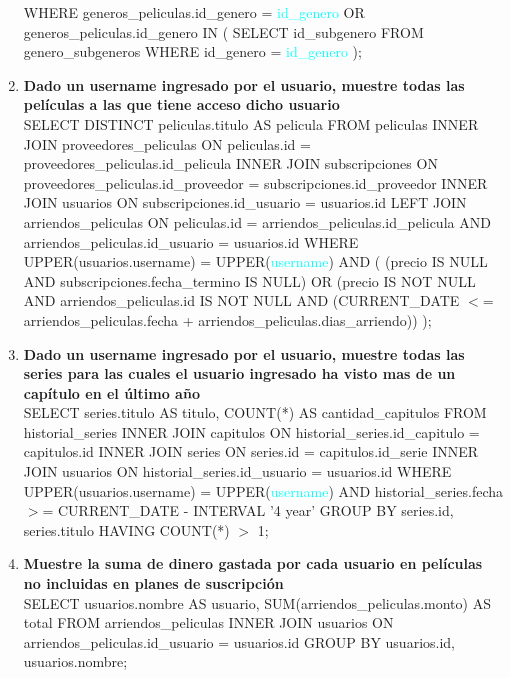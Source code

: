 \documentclass{article}
\begin{document}
\begin{enumerate}
    WHERE generos\_peliculas.id\_genero = \textcolor{cyan}{id\_genero}
    OR generos\_peliculas.id\_genero IN (
        SELECT id\_subgenero FROM genero\_subgeneros WHERE id\_genero = \textcolor{cyan}{id\_genero}
    );
\newpage
    \item \textbf{Dado un username ingresado por el usuario, muestre todas las películas a las que tiene acceso dicho usuario} \\
    SELECT DISTINCT peliculas.titulo AS pelicula FROM peliculas
    INNER JOIN proveedores\_peliculas ON peliculas.id = proveedores\_peliculas.id\_pelicula
    INNER JOIN subscripciones ON proveedores\_peliculas.id\_proveedor = subscripciones.id\_proveedor
    INNER JOIN usuarios ON subscripciones.id\_usuario = usuarios.id
    LEFT JOIN arriendos\_peliculas ON peliculas.id = arriendos\_peliculas.id\_pelicula AND arriendos\_peliculas.id\_usuario = usuarios.id
    WHERE UPPER(usuarios.username) = UPPER(\textcolor{cyan}{username})
    AND (
        (precio IS NULL AND subscripciones.fecha\_termino IS NULL)
        OR
        (precio IS NOT NULL AND arriendos\_peliculas.id IS NOT NULL AND (CURRENT\_DATE $<$= arriendos\_peliculas.fecha + arriendos\_peliculas.dias\_arriendo))
    );
    \item \textbf{Dado un username ingresado por el usuario, muestre todas las series para las cuales el usuario ingresado ha visto mas de un capítulo en el último año} \\
    SELECT series.titulo AS titulo, COUNT(*) AS cantidad\_capitulos FROM historial\_series
    INNER JOIN capitulos ON historial\_series.id\_capitulo = capitulos.id
    INNER JOIN series ON series.id = capitulos.id\_serie
    INNER JOIN usuarios ON historial\_series.id\_usuario = usuarios.id
    WHERE UPPER(usuarios.username) = UPPER(\textcolor{cyan}{username})
    AND historial\_series.fecha $>$= CURRENT\_DATE - INTERVAL '4 year'
    GROUP BY series.id, series.titulo
    HAVING COUNT(*) $>$ 1;
    \item \textbf{Muestre la suma de dinero gastada por cada usuario en películas no incluidas en planes de suscripción} \\
    SELECT usuarios.nombre AS usuario, SUM(arriendos\_peliculas.monto) AS total FROM arriendos\_peliculas
    INNER JOIN usuarios ON arriendos\_peliculas.id\_usuario = usuarios.id
    GROUP BY usuarios.id, usuarios.nombre;
\end{enumerate}
\end{document}
